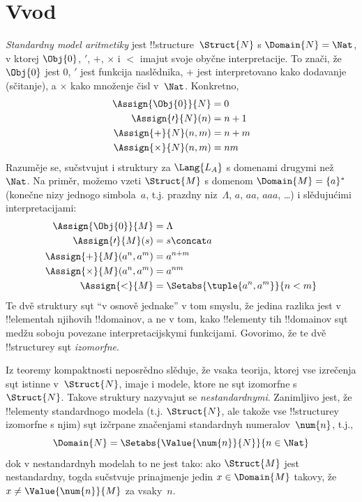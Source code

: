 \documentclass[../../../include/open-logic-section]{subfiles}
\begin{document}
\section{Vvod}

\emph{Standardny model aritmetiky} jest
!!{structure}~$\Struct{N}$ s $\Domain{N} = \Nat$, v ktorej
$\Obj{0}$, $\prime$, $+$, $\times$ i $<$ imajut svoje obyčne
interpretacije. To znači, že $\Obj{0}$ jest $0$, $\prime$ jest funkcija
naslědnika, $+$ jest interpretovano kako dodavanje (sčitanje), a $\times$ kako
množenje čisl v~$\Nat$. Konkretno,
\begin{align*}
  \Assign{\Obj{0}}{N} & = 0\\
  \Assign{\prime}{N}(n) & = n + 1\\
  \Assign{+}{N}(n, m) & = n + m\\
  \Assign{\times}{N}(n, m) & = nm
\end{align*}
Razuměje se, sučstvujut i struktury za $\Lang{L_A}$ s domenami
drugymi než~$\Nat$. Na priměr, možemo vzeti $\Struct{M}$ s domenom
$\Domain{M} = \{a\}^*$ (konečne nizy jednogo
simbola~$a$, t.j. prazdny niz~$\Lambda$, $a$, $aa$, $aaa$, \dots) i slědujućimi
interpretacijami:
\begin{align*}
  \Assign{\Obj{0}}{M} & = \Lambda\\
  \Assign{\prime}{M}(s) & = s \concat a\\
  \Assign{+}{M}(a^n, a^m) & = a^{n + m}\\
  \Assign{\times}{M}(a^n, a^m) & = a^{nm}\\
  \Assign{<}{M} & = \Setabs{\tuple{a^n,a^m}}{n < m}
\end{align*}
Te dvě struktury sųt ``v osnově jednake'' v tom smyslu, že jedina
razlika jest v !!{element}ah njihovih !!{domain}ov, a ne v tom, kako
!!{element}y tih !!{domain}ov sųt medžu soboju povezane
interpretacijskymi funkcijami. Govorimo, že te dvě !!{structure}y sųt
\emph{izomorfne}.

Iz teoremy kompaktnosti neposrědno slěduje, že vsaka teorija,
ktorej vse izrečenja sųt istinne v~$\Struct{N}$, imaje i modele, ktore
ne sųt izomorfne s~$\Struct{N}$. Takove struktury nazyvajut se
\emph{nestandardnymi}. Zanimljivo jest, že !!{element}y standardnogo
modela (t.j. $\Struct{N}$, ale takože vse !!{structure}y izomorfne s
njim) sųt izčrpane značenjami standardnyh numeralov~$\num{n}$, t.j.,
\[
\Domain{N} = \Setabs{\Value{\num{n}}{N}}{n \in \Nat}
\]
dok v nestandardnyh modelah to ne jest tako: ako $\Struct{M}$ jest
nestandardny, togda sučstvuje prinajmenje jedin $x \in \Domain{M}$ takovy,
že $x \neq \Value{\num{n}}{M}$ za vsaky~$n$.
\end{document}
